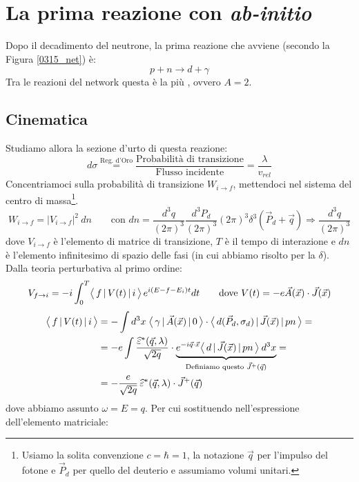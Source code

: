 \section{La prima reazione con \textit{ab-initio}}\label{0317-sec-abinitio}
Dopo il decadimento del neutrone, la prima reazione che avviene (secondo la Figura \ref{0315_net}) è:
$$p + n \to d + \gamma$$
Tra le reazioni del network questa è la più , ovvero $A=2$. 
\subsection{Cinematica} Studiamo allora la sezione d'urto di questa reazione:
$$d\sigma \overset{\text{Reg. d'Oro}}{=} \frac{\text{Probabilità di transizione}}{\text{Flusso incidente}} = \frac{\lambda}{v_{rel}}$$
Concentriamoci sulla probabilità di transizione $W_{i\to f}$, mettendoci nel sistema del centro di massa\footnote{Usiamo la solita convenzione $c=\hbar = 1$, la notazione $\vec{q}$ per l'impulso del fotone e $\vec{P}_d$ per quello del deuterio e assumiamo volumi unitari.}.
$$W_{i\to f} = |V_{i\to f}|^2\:dn \qquad \text{con   } dn = \frac{d^3q}{(2\pi)^3}\frac{d^3P_d}{(2\pi)^3} (2\pi)^3 \delta^3(\vec{P}_d+\vec{q}) \Rightarrow \frac{d^3q}{(2\pi)^3}$$
dove $V_{i\to f}$ è l'elemento di matrice di transizione, $T$ è il tempo di interazione e $dn$ è l'elemento infinitesimo di spazio delle fasi (in cui abbiamo risolto per la $\delta$). Dalla teoria perturbativa al primo ordine:
$$V_{f\to i} = -i \int_0^T \bigl\langle\, f\, |\,V(t)\, |\,i\, \bigr\rangle\, e^{i(E-f-E_i)t} dt \qquad \text{dove } V(t) = -e \vec{A}(\vec{x}) \cdot \vec{J}(\vec{x}) $$
\begin{displaymath}
\begin{aligned}
\bigl\langle\, f\, |\,V(t)\, |\,i\, \bigr\rangle &= - \int d^3x \; \bigl\langle\, \gamma\, |\,\vec{A}(\vec{x})\, |\,0\, \bigr\rangle \cdot \bigl\langle\, d(\vec{P}_d,\sigma_d)\, |\,\vec{J}(\vec{x})\, |\,pn\, \bigr\rangle = \\
&= -e \int \frac{\widehat{\varepsilon}^*(\vec{q},\lambda)}{\sqrt{2q}} \cdot \underbrace{e^{-i\vec{q}\cdot\vec{x}}\bigl\langle\, d\, |\,\vec{J}(\vec{x})\, |\,pn\, \bigr\rangle\: d^3x}_{\text{Definiamo questo } \vec{J}^+(\vec{q})} = \\
&= -\frac{e}{\sqrt{2q}} \, \widehat{\varepsilon}^*(\vec{q},\lambda) \cdot \vec{J}^+(\vec{q})
\end{aligned}
\end{displaymath}
dove abbiamo assunto $\omega = E = q$. Per cui sostituendo nell'espressione dell'elemento matriciale:
